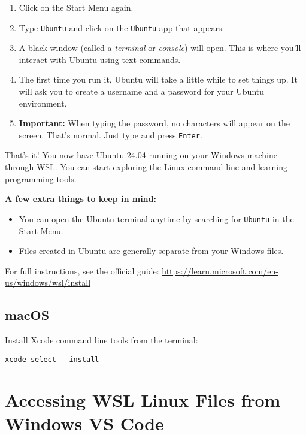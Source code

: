 \documentclass{article}
\begin{document}
\begin{enumerate}[leftmargin=2em, resume]
    \item Click on the Start Menu again.
    \item Type \texttt{Ubuntu} and click on the \texttt{Ubuntu} app that appears.
    \item A black window (called a \textit{terminal} or \textit{console}) will open. This is where you'll interact with Ubuntu using text commands.
    \item The first time you run it, Ubuntu will take a little while to set things up. It will ask you to create a username and a password for your Ubuntu environment.
    
    \item \textbf{Important:} When typing the password, no characters will appear on the screen. That’s normal. Just type and press \texttt{Enter}.
\end{enumerate}

That's it! You now have Ubuntu 24.04 running on your Windows machine through WSL. You can start exploring the Linux command line and learning programming tools.

\vspace{1em}
\textbf{A few extra things to keep in mind:}
\begin{itemize}[leftmargin=1.5em]
    \item You can open the Ubuntu terminal anytime by searching for \texttt{Ubuntu} in the Start Menu.
    \item Files created in Ubuntu are generally separate from your Windows files.
\end{itemize}

\vspace{0.5em}
For full instructions, see the official guide:  
\url{https://learn.microsoft.com/en-us/windows/wsl/install}

\subsection{macOS}
Install Xcode command line tools from the terminal:
\begin{verbatim}
xcode-select --install
\end{verbatim}

\section{Accessing WSL Linux Files from Windows VS Code}
\end{document}
